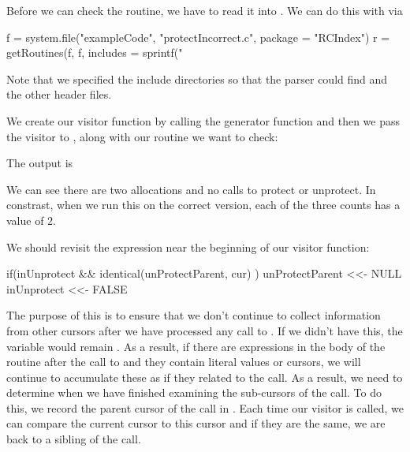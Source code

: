 Before we can check the routine, we have to read it into \R{}.
We can do this with  via
\begin{RCode}
f = system.file("exampleCode", "protectIncorrect.c", package = "RCIndex")
r = getRoutines(f, f, includes = sprintf("%
\end{RCode}
Note that we specified the include directories so that
the parser could find  and the other 
\R{} header files.

We create our visitor function by calling the generator function
and then we pass the visitor to ,
along with our routine we want to check:
The output is 
We can see there are two allocations and no calls to protect or
unprotect.  
In constrast, when we run this on the correct version, 
each of the three counts has a value of $2$.

\begin{comment}
f = system.file("exampleCode", "protectCorrect.c", package = "RCIndex")
r = getRoutines(f, f, includes = sprintf("%
v = genProtectAnalyzer()
visitCursor(r$R_foo, v$update)
v$info()
\end{comment}

We should revisit the  expression near the beginning
of our visitor function:
\begin{RCode}
if(inUnprotect && identical(unProtectParent, cur) ) {
   unProtectParent <<- NULL
   inUnprotect <<- FALSE
}
\end{RCode}
The purpose of this is to ensure that we don't continue to collect
information from other cursors after we have processed any call to
.  If we didn't have this, the variable
 would remain \Rtrue.  As a result, if there are
\C{} expressions in the body of the routine after the call to
 and they contain literal values or
 cursors, we will continue to accumulate
these as if they related to the  call.  As a result,
we need to determine when we have finished examining the sub-cursors
of the  call.  To do this, we record the parent
cursor of the  call in . Each
time our visitor is called, we can compare the current cursor to this
cursor and if they are the same, we are back to a sibling of the
 call.


